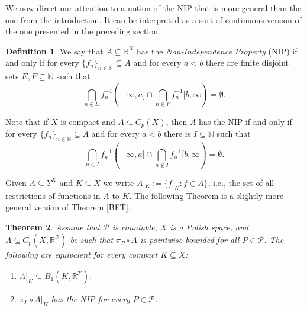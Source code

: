 \documentclass[psamsfonts]{amsart}
\newtheorem{thm}{Theorem}[section]
\theoremstyle{definition}
\newtheorem{defn}[thm]{Definition}
\theoremstyle{remark}
\numberwithin{equation}{section}
\begin{document}
We now direct our attention to a notion of the NIP that is more general than the one from the introduction. It can be interpreted as a sort of continuous version of the one presented in the preceding section.

\begin{defn}
    We say that $A\subseteq \mathbb{R}^X$ has the \emph{Non-Independence Property} (NIP) if and only if for every $\{f_n\}_{n\in\mathbb N}\subseteq A$ and for every $a<b$ there are finite disjoint sets $E,F\subseteq\mathbb{N}$ such that
    $$\bigcap_{n\in E}f_n^{-1}(-\infty,a]\cap\bigcap_{n\in F}f_n^{-1}[b,\infty)=\emptyset.$$
\end{defn}

Note that if $X$ is compact and $A\subseteq C_p(X)$, then $A$ has the NIP if and only if for every $\{f_n\}_{n\in\mathbb N}\subseteq A$ and for every $a<b$ there is $I\subseteq\mathbb{N}$ such that
$$\bigcap_{n\in I}f_n^{-1}(-\infty,a]\cap\bigcap_{n\notin I}f_n^{-1}[b,\infty)=\emptyset.$$

Given $A\subseteq Y^X$ and $K\subseteq X$ we write $A|_K:=\{f|_K:f\in A\}$, i.e., the set of all restrictions of functions in $A$ to $K$. The following Theorem is a slightly more general version of Theorem \ref{BFT}.

\begin{thm}\label{Generalized BFT}
    Assume that $\mathcal P$ is countable, $X$ is a Polish space, and $A\subseteq C_p(X,\mathbb R^\mathcal P)$ be such that $\pi_P\circ A$ is pointwise bounded for all $P\in\mathcal{P}$. The following are equivalent for every compact $K\subseteq X$:

    \begin{enumerate}
        \item $\overline{A|_K}\subseteq B_1(K,\mathbb R^\mathcal P)$.
        \item $\pi_P\circ A|_K$ has the NIP for every $P\in\mathcal P$.
    \end{enumerate}
\end{thm}
\end{document}
